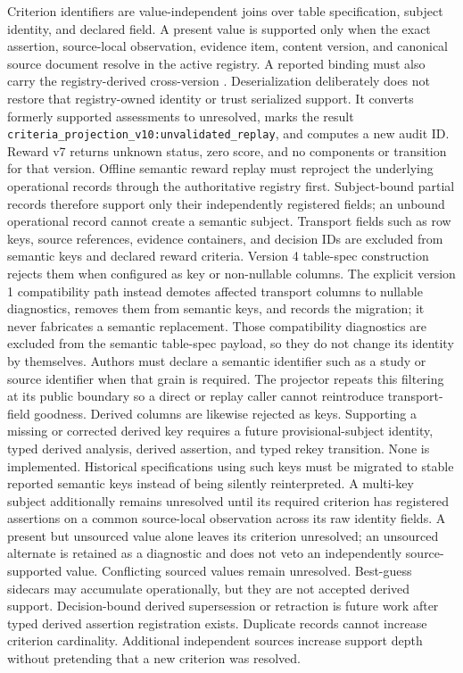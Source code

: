 \documentclass[11pt]{article}
\newcommand{\code}[1]{\path{#1}}
\newcommand{\action}[1]{\texttt{#1}}
\begin{document}
Criterion identifiers are value-independent joins over table specification,
subject identity, and declared field.  A present value is supported only when
the exact assertion, source-local observation, evidence item, content version,
and canonical source document resolve in the active registry.  A reported
binding must also carry the registry-derived cross-version
\code{semantic\_claim\_id}.  Deserialization deliberately does not restore that
registry-owned identity or trust serialized support.  It converts formerly
supported assessments to unresolved, marks the result
\action{criteria\_projection\_v10:unvalidated\_replay}, and computes a new audit
ID.  Reward v7 returns unknown status, zero score, and no components or
transition for that version.  Offline semantic reward replay must reproject the
underlying operational records through the authoritative registry first.
Subject-bound
partial records therefore support only their independently registered fields;
an unbound operational record cannot create a semantic subject.
Transport fields such as row keys, source references, evidence containers, and
decision IDs are excluded from semantic keys and declared reward criteria.
Version 4 table-spec construction rejects them when configured as key or
non-nullable columns.  The explicit version 1 compatibility path instead
demotes affected transport columns to nullable diagnostics, removes them from
semantic keys, and records the migration; it never fabricates a semantic
replacement.  Those compatibility diagnostics are excluded from the semantic
table-spec payload, so they do not change its identity by themselves.  Authors
must declare a semantic identifier such as a study or
source identifier when that grain is required.  The projector repeats this
filtering at its public boundary so a direct or replay caller cannot
reintroduce transport-field goodness.
Derived \code{best\_guess} columns are likewise rejected as keys.  Supporting
a missing or corrected derived key requires a future provisional-subject
identity, typed derived analysis, derived assertion, and typed rekey
transition.  None is implemented.  Historical specifications using such keys
must be migrated to stable reported semantic keys instead of being silently
reinterpreted.
A multi-key subject additionally remains unresolved until its required
\code{\_\_subject\_identity\_\_} criterion has registered assertions on a
common source-local observation across its raw identity fields.
A present but unsourced value alone leaves its criterion unresolved; an
unsourced alternate is retained as a diagnostic and does not veto an
independently source-supported value.  Conflicting sourced values remain unresolved.
Best-guess sidecars may accumulate operationally, but they are not accepted
derived support.  Decision-bound derived supersession or retraction is future
work after typed derived assertion registration exists.
Duplicate records cannot increase criterion cardinality.  Additional
independent sources increase support depth without pretending that a new
criterion was resolved.
\end{document}

